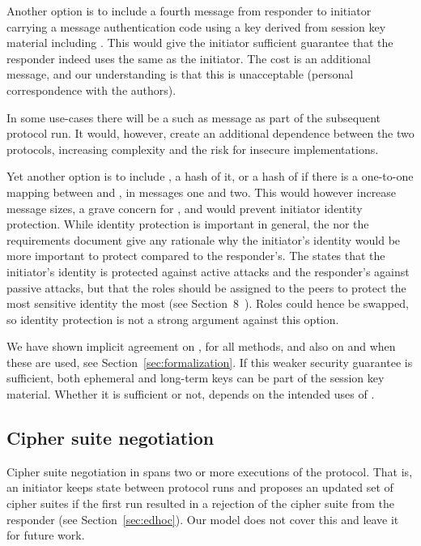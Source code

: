 \documentclass[runningheads,draft,x11names]{llncs}
\begin{document}
Another option is to include a fourth message from responder to initiator
carrying a message authentication code using a key derived from session key
material including \mGiy{}.
%
This would give the initiator sufficient guarantee that the responder indeed
uses the same \mGiy{} as the initiator.
%
The cost is an additional message, and our understanding is that this is
unacceptable (personal correspondence with the \mSpec{} authors).
%

In some use-cases there will be a such as message as part of
the subsequent \mOscore{} protocol run.
%
It would, however, create an additional dependence between the two protocols,
increasing complexity and the risk for insecure implementations.
%

Yet another option is to include \mGi{}, a hash of it, or a hash of \mIdcredi{}
if there is a one-to-one mapping between \mIdcredi{} and \mGi{}, in messages one
and two.
%
This would however increase message sizes, a grave concern for \mEdhoc{}, and
would prevent initiator identity protection.
%
While identity protection is important in general, the \mSpec{} nor the
requirements document give any rationale why the initiator's identity would be
more important to protect compared to the responder's.
%
The \mSpec{} states that the
initiator's identity is protected against active attacks and the responder's
against passive attacks, but that the roles should be assigned to the \mCoap{}
peers to protect the most sensitive identity the most (see
Section~8~\cite{selander-lake-edhoc-01}).
%
Roles could hence be swapped, so identity protection is not a strong argument
against this option.
%

We have shown implicit agreement on \mGx{}, \mGy{} for all methods, and also on
\mGiy{} and \mGrx{} when these are used, see Section~\ref{sec:formalization}.
%
If this weaker security guarantee is sufficient, both ephemeral and long-term
keys can be part of the session key material.
%
Whether it is sufficient or not, depends on the intended uses of \mEdhoc{}.
%

\subsection{Cipher suite negotiation}
\label{sec:ciphersuiteNegotiation}
%
Cipher suite negotiation in \mEdhoc{} spans two or more executions of the
protocol.
%
That is, an initiator keeps state between protocol runs and proposes an updated
set of cipher suites if the first run resulted in a rejection of the
cipher suite from the responder (see Section~\ref{sec:edhoc}).
%
Our model does not cover this and leave it for future work.
%
\end{document}
